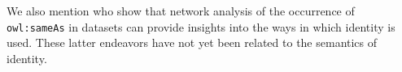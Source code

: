 We also mention \cite{DingShinavierShangguanMcguinness2010} who show that
  network analysis of the occurrence of {\small \texttt{owl:sameAs}}
  in datasets can provide insights into the ways in which identity is used.
These latter endeavors have not yet been related to the semantics of
  identity.


